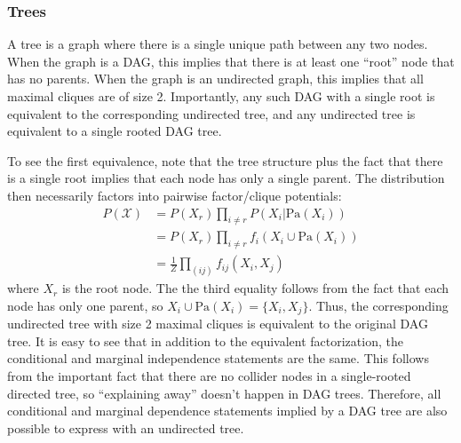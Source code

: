 \documentclass[a4paper]{article}
\begin{document}
\subsubsection{Trees}
A tree is a graph where there is a single unique path between any two nodes. When the graph is a DAG, this implies that there is at least one ``root'' node that has no parents. When the graph is an undirected graph, this implies that all maximal cliques are of size 2. Importantly, any such DAG with a single root is equivalent to the corresponding undirected tree, and any undirected tree is equivalent to a single rooted DAG tree. 

To see the first equivalence, note that the tree structure plus the fact that there is a single root implies that each node has only a single parent. The distribution then necessarily factors into pairwise factor/clique potentials:
\begin{align*}
P(\mathcal{X}) &= P(X_r)\prod_{i\neq r} P(X_i|\textrm{Pa}(X_i)) \\
&= P(X_r) \prod_{i\neq r} f_i(X_i \cup \textrm{Pa}(X_i)) \\
&= \frac{1}{Z} \prod_{(ij)} f_{ij}(X_i,X_j)
\end{align*}
where $X_r$ is the root node. The the third equality follows from the fact that each node has only one parent, so $X_i \cup \textrm{Pa}(X_i) = \{X_i,X_j\}$. Thus, the corresponding undirected tree with size 2 maximal cliques is equivalent to the original DAG tree. It is easy to see that in addition to the equivalent factorization, the conditional and marginal independence statements are the same. This follows from the important fact that there are no collider nodes in a single-rooted directed tree, so ``explaining away'' doesn't happen in DAG trees. Therefore, all conditional and marginal dependence statements implied by a DAG tree are also possible to express with an undirected tree. 
\end{document}
